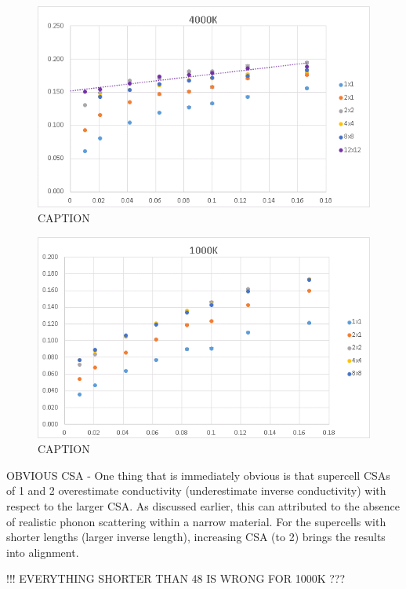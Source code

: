 \begin{figure}[h!]
\includegraphics[width=\linewidth]{Figures/direct_inv_4000.png}
\caption[direct inv 4000]{CAPTION}
\label{fig:direct_inv_4000}
\end{figure}

\begin{figure}[h!]
\includegraphics[width=\linewidth]{Figures/direct_inv_1000.png}
\caption[direct inv 1000]{CAPTION}
\label{fig:direct_inv_1000}
\end{figure}

OBVIOUS CSA - One thing that is immediately obvious is that supercell CSAs of 1 and 2 overestimate conductivity (underestimate inverse conductivity) with respect to the larger CSA. As discussed earlier, this can attributed to the absence of realistic phonon scattering within a narrow material. For the supercells with shorter lengths (larger inverse length), increasing CSA (to 2) brings the results into alignment. 

!!! EVERYTHING SHORTER THAN 48 IS WRONG FOR 1000K ???

